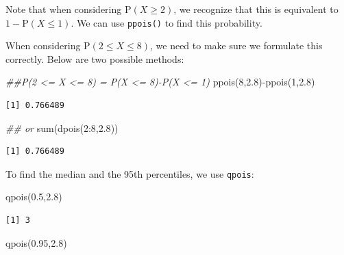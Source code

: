 \documentclass[
  letterpaper,
  DIV=11,
  numbers=noendperiod]{scrreprt}
\newenvironment{Shaded}{\begin{snugshade}}{\end{snugshade}}
\newcommand{\DecValTok}[1]{\textcolor[rgb]{0.68,0.00,0.00}{#1}}
\newcommand{\DocumentationTok}[1]{\textcolor[rgb]{0.37,0.37,0.37}{\textit{#1}}}
\newcommand{\FloatTok}[1]{\textcolor[rgb]{0.68,0.00,0.00}{#1}}
\newcommand{\FunctionTok}[1]{\textcolor[rgb]{0.28,0.35,0.67}{#1}}
\newcommand{\NormalTok}[1]{\textcolor[rgb]{0.00,0.23,0.31}{#1}}
\newcommand{\SpecialCharTok}[1]{\textcolor[rgb]{0.37,0.37,0.37}{#1}}
\begin{document}
Note that when considering \(\mbox{P}(X\geq 2)\), we recognize that this
is equivalent to \(1-\mbox{P}(X\leq 1)\). We can use \texttt{ppois()} to
find this probability.

When considering \(\mbox{P}(2\leq X \leq 8)\), we need to make sure we
formulate this correctly. Below are two possible methods:

\begin{Shaded}
\begin{Highlighting}[]
\DocumentationTok{\#\#P(2 \textless{}= X \textless{}= 8) = P(X \textless{}= 8){-}P(X \textless{}= 1)}
\FunctionTok{ppois}\NormalTok{(}\DecValTok{8}\NormalTok{,}\FloatTok{2.8}\NormalTok{)}\SpecialCharTok{{-}}\FunctionTok{ppois}\NormalTok{(}\DecValTok{1}\NormalTok{,}\FloatTok{2.8}\NormalTok{)}
\end{Highlighting}
\end{Shaded}

\begin{verbatim}
[1] 0.766489
\end{verbatim}

\begin{Shaded}
\begin{Highlighting}[]
\DocumentationTok{\#\# or}
\FunctionTok{sum}\NormalTok{(}\FunctionTok{dpois}\NormalTok{(}\DecValTok{2}\SpecialCharTok{:}\DecValTok{8}\NormalTok{,}\FloatTok{2.8}\NormalTok{))}
\end{Highlighting}
\end{Shaded}

\begin{verbatim}
[1] 0.766489
\end{verbatim}

To find the median and the 95th percentiles, we use \texttt{qpois}:

\begin{Shaded}
\begin{Highlighting}[]
\FunctionTok{qpois}\NormalTok{(}\FloatTok{0.5}\NormalTok{,}\FloatTok{2.8}\NormalTok{)}
\end{Highlighting}
\end{Shaded}

\begin{verbatim}
[1] 3
\end{verbatim}

\begin{Shaded}
\begin{Highlighting}[]
\FunctionTok{qpois}\NormalTok{(}\FloatTok{0.95}\NormalTok{,}\FloatTok{2.8}\NormalTok{)}
\end{Highlighting}
\end{Shaded}
\end{document}
